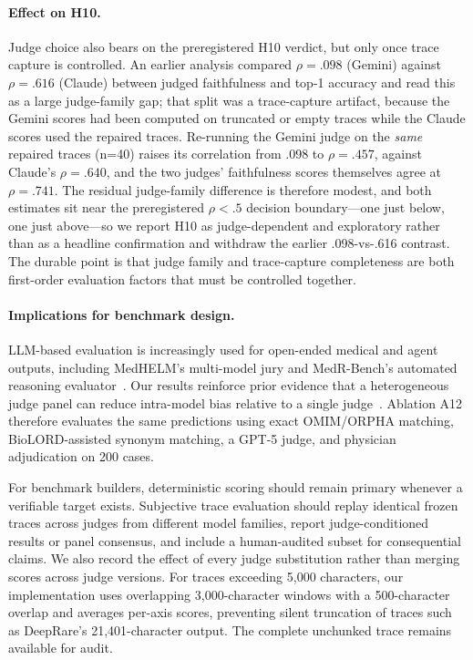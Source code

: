 \documentclass[letterpaper]{article} %
\begin{document}
\paragraph{Effect on H10.}
Judge choice also bears on the preregistered H10 verdict, but only once trace capture is controlled. An earlier analysis compared $\rho=.098$ (Gemini) against $\rho=.616$ (Claude) between judged faithfulness and top-1 accuracy and read this as a large judge-family gap; that split was a trace-capture artifact, because the Gemini scores had been computed on truncated or empty traces while the Claude scores used the repaired traces. Re-running the Gemini judge on the \emph{same} repaired traces (n=40) raises its correlation from .098 to $\rho=.457$, against Claude's $\rho=.640$, and the two judges' faithfulness scores themselves agree at $\rho=.741$. The residual judge-family difference is therefore modest, and both estimates sit near the preregistered $\rho<.5$ decision boundary---one just below, one just above---so we report H10 as judge-dependent and exploratory rather than as a headline confirmation and withdraw the earlier .098-vs-.616 contrast. The durable point is that judge family and trace-capture completeness are both first-order evaluation factors that must be controlled together.

\paragraph{Implications for benchmark design.}
LLM-based evaluation is increasingly used for open-ended medical and agent outputs, including MedHELM's multi-model jury and MedR-Bench's automated reasoning evaluator~\cite{bedi2026medhelm,qiu2025medrbench}. Our results reinforce prior evidence that a heterogeneous judge panel can reduce intra-model bias relative to a single judge~\cite{verga2024juries}. Ablation A12 therefore evaluates the same predictions using exact OMIM/ORPHA matching, BioLORD-assisted synonym matching, a GPT-5 judge, and physician adjudication on 200 cases.

For benchmark builders, deterministic scoring should remain primary whenever a verifiable target exists. Subjective trace evaluation should replay identical frozen traces across judges from different model families, report judge-conditioned results or panel consensus, and include a human-audited subset for consequential claims. We also record the effect of every judge substitution rather than merging scores across judge versions. For traces exceeding 5,000 characters, our implementation uses overlapping 3,000-character windows with a 500-character overlap and averages per-axis scores, preventing silent truncation of traces such as DeepRare's 21,401-character output. The complete unchunked trace remains available for audit.


\end{document}
